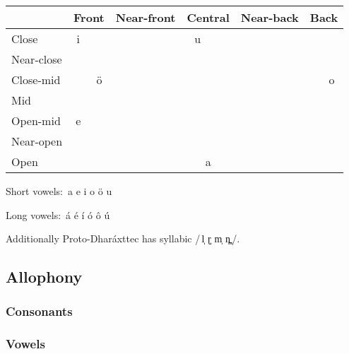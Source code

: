 \documentclass[11pt,a4paper,titlepage]{article}
\newcommand\phoneme[1]{/\,#1\,/}
\newcommand\orth[1]{\textlangle\,#1\,\textrangle}
\begin{document}
        \begin{tabular}{|l|cc|cc|cc|cc|cc|}

          \hline
          & \multicolumn{2}{c}{Front} & \multicolumn{2}{c}{Near-front} & \multicolumn{2}{c}{Central} & \multicolumn{2}{c}{Near-back} & \multicolumn{2}{c|}{Back} \\
          \hline
          Close & i & & & & u & & & & & \\
          \hline
          Near-close & & & & & & & & & & \\
          \hline
          Close-mid & & ö & & & & & & & & o \\
          \hline
          Mid & & & & & & & & & & \\
          \hline
          Open-mid & e & & & & & & & & & \\
          \hline
          Near-open & & & & & & & & & & \\
          \hline
          Open & & & & & \multicolumn{2}{c|}{a} & & & & \\
          \hline

        \end{tabular}

        Short vowels: \orth{a e i o ö u}

        Long vowels: \orth{á é í ó ô ú}

        Additionally Proto-Dharáxttec has syllabic \phoneme{l̩ ɽ̩ m̩ n̪̩}.

    \subsection{Allophony}
      \subsubsection{Consonants}


      \subsubsection{Vowels}
\end{document}

